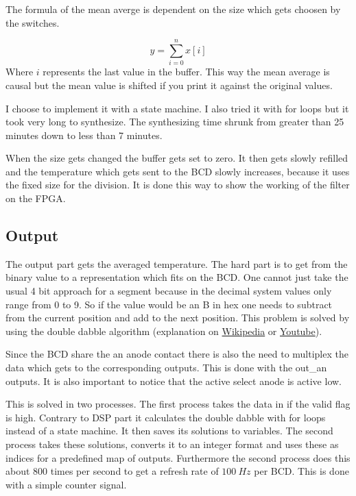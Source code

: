 The formula of the mean averge is dependent on the size which gets choosen by the switches.

\begin{equation}
y = \sum_{i=0}^n x[i]
\end{equation}
Where $i$ represents the last value in the buffer. This way the mean average is causal but the mean
value is shifted if you print it against the original values.

I choose to implement it with a state machine. I also tried it with for loops but it took very
long to synthesize. The synthesizing time shrunk from greater than
25 minutes down to less than 7 minutes.

When the size gets changed the buffer gets set to zero. It then gets slowly refilled and the temperature
which gets sent to the BCD slowly increases, because it uses the fixed size for the division. 
It is done this way to show the working of the filter on the FPGA.

\subsection{Output}
The output part gets the averaged temperature. The hard part is to get from the binary value to a 
representation which fits on the BCD. One cannot just take the usual 4 bit approach for a segment 
because in the decimal system values only range from 0 to 9. So if the value would be an B in hex
one needs to subtract from the current position and add to the next position. This problem is solved
by using the double dabble algorithm (explanation on \href{https://en.wikipedia.org/wiki/Double_dabble}{Wikipedia} or \href{https://www.youtube.com/watch?v=eXIfZ1yKFlA}{Youtube}).

Since the BCD share the an anode contact there is also the need to multiplex the data which gets
to the corresponding outputs. This is done with the out_an outputs. It is also important to notice
that the active select anode is active low.

This is solved in two processes. The first process takes the data in if the valid flag is high. Contrary to 
DSP part it calculates the double dabble with for loops instead of a state machine. It then saves its
solutions to variables. The second process takes these solutions, converts it to an integer format and
uses these as indices for a predefined map of outputs. Furthermore the second process does this about
800 times per second to get a refresh rate of $100~Hz$ per BCD. This is done with a simple counter signal.


